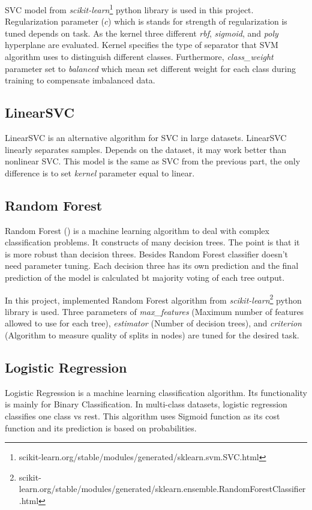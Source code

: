 SVC model from \textit{scikit-learn}\footnote{scikit-learn.org/stable/modules/generated/sklearn.svm.SVC.html} python library is used in this project. Regularization parameter ($ c $) which is stands for strength of regularization is tuned depends on task. As the kernel three different \textit{rbf}, \textit{sigmoid}, and \textit{poly} hyperplane are evaluated. Kernel specifies the type of separator that SVM algorithm uses to distinguish different classes. Furthermore, \textit{class\_weight} parameter set to \textit{balanced} which mean set different weight for each class during training to compensate imbalanced data. 


\subsection{LinearSVC}
LinearSVC is an alternative algorithm for SVC in large datasets. LinearSVC linearly separates samples. Depends on the dataset, it may work better than nonlinear SVC. This model is the same as SVC from the previous part, the only difference is to set \textit{kernel} parameter equal to linear. 
 
\subsection{Random Forest}
Random Forest (\cite{randomforest}) is a machine learning algorithm to deal with complex classification problems. It constructs of many decision trees. The point is that it is more robust than decision threes. Besides Random Forest classifier doesn't need parameter tuning. Each decision three has its own prediction and the final prediction of the model is calculated bt majority voting of each tree output. 

In this project, implemented Random Forest algorithm from \textit{scikit-learn}\footnote{scikit-learn.org/stable/modules/generated/sklearn.ensemble.RandomForestClassifier.html} python library is used. Three parameters of \textit{max\_features} (Maximum number of features allowed to use for each tree), \textit{estimator} (Number of decision trees), and \textit{criterion} (Algorithm to measure quality of splits in nodes) are tuned for the desired task.

\subsection{Logistic Regression}
Logistic Regression is a machine learning classification algorithm. Its functionality is mainly for Binary Classification. In multi-class datasets, logistic regression classifies one class vs rest. This algorithm uses Sigmoid function as its cost function and its prediction is based on probabilities. 

